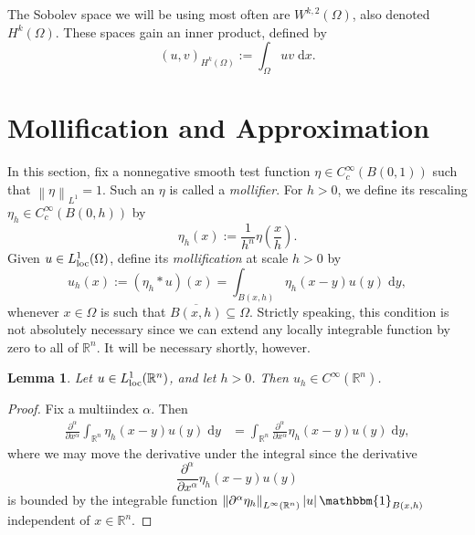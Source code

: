 \documentclass{book}
\newcommand{\bbR}{\mathbb{R}}
\newcommand{\bbone}{\mathbbm{1}}
\renewcommand{\d}{\mathrm{d}}
\newcommand{\abs}[1]{\left\lvert {#1} \right\rvert}
\newcommand{\norm}[1]{\left\lVert {#1} \right\rVert}
\newcommand{\parens}[1]{\left( {#1} \right)}
\newcommand{\pdv}[3][]{\frac{\partial^#1 {#2}}{\partial{#3}^{#1}}}
\newtheorem{lemma}[theorem]{Lemma}
\theoremstyle{definition}
\numberwithin{equation}{chapter}
\begin{document}
The Sobolev space we will be using most often are $W^{k,2}(\Omega)$, also denoted $H^k(\Omega)$. These spaces gain an inner product, defined by 
\begin{equation}
    (u,v)_{H^k(\Omega)} := \int_\Omega uv \; \d{x}.
\end{equation}


\section{Mollification and Approximation}

In this section, fix a nonnegative smooth test function $\eta \in C_c^\infty(B(0,1))$ such that $\norm{\eta}_{L^1} = 1$. Such an $\eta$ is called a \textit{mollifier}. For $h > 0$, we define its rescaling $\eta_h \in C_c^\infty(B(0,h))$ by
\begin{equation}
    \eta_h(x) := \frac{1}{h^n} \eta\parens{\frac{x}{h}}.
\end{equation}
Given $u \in L^1_{\rm loc}(\Omega)$, define its \textit{mollification} at scale $h > 0$ by
\begin{equation}
    u_h(x) := (\eta_h \ast u)(x) = \int_{B(x,h)} \eta_h(x - y) u(y) \; \d{y},
\end{equation}
whenever $x \in \Omega$ is such that $\overline{B(x,h)} \subseteq \Omega$. Strictly speaking, this condition is not absolutely necessary since we can extend any locally integrable function by zero to all of $\bbR^n$. It will be necessary shortly, however.
\begin{lemma}
    Let $u \in L^1_{\rm loc}(\bbR^n)$, and let $h > 0$. Then $u_h \in C^\infty(\bbR^n)$.
\end{lemma}
\begin{proof}
    Fix a multiindex $\alpha$. Then
    \begin{equation} \begin{aligned}
        \pdv[\alpha]{}{x} \int_{\bbR^n} \eta_h(x - y) u(y) \; \d{y}
        &= \int_{\bbR^n} \pdv[\alpha]{}{x} \eta_h(x - y) u(y) \; \d{y},
    \end{aligned} \end{equation}
    where we may move the derivative under the integral since the derivative 
    \begin{equation}
        \pdv[\alpha]{}{x} \eta_h(x - y) u(y)
    \end{equation}
    is bounded by the integrable function $\norm{\partial^\alpha \eta_h}_{L^\infty(\bbR^n)} \abs{u} \bbone_{B(x,h)}$ independent of $x \in \bbR^n$.
\end{proof}
\end{document}
